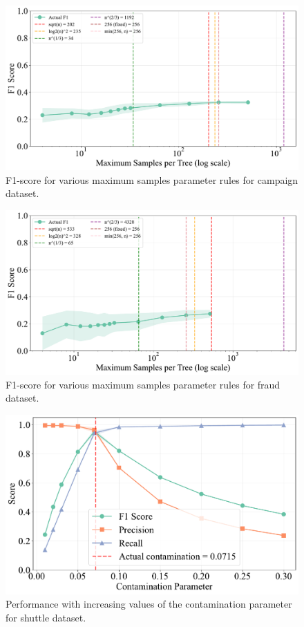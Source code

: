 \documentclass[10pt, conference]{IEEEtran}
\begin{document}
\begin{figure}[H]
	\centering
	\includegraphics[width=0.95\linewidth]{../results/campaign/max_samples/empirical_rules.pdf}
	\caption{F1-score for various maximum samples parameter rules for campaign dataset.}
	\label{fig:rule_samples_campaign}
\end{figure}
\begin{figure}[H]
	\centering
	\includegraphics[width=0.95\linewidth]{../results/fraud/max_samples/empirical_rules.pdf}
	\caption{F1-score for various maximum samples parameter rules for fraud dataset.}
	\label{fig:rule_samples_fraud}
\end{figure}



\begin{figure}[H]
	\centering
	\includegraphics[width=0.95\linewidth]{../results/shuttle/contamination/performance_vs_contamination.pdf}
	\caption{Performance with increasing values of the contamination parameter for shuttle dataset.}
	\label{fig:contamination_shuttle}
\end{figure}
\end{document}
